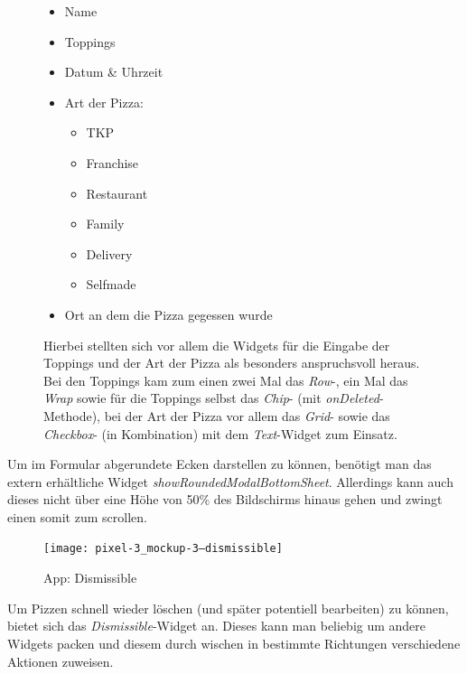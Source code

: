 \begin{figure}[H]
        \begin{itemize}
            \itemsep-0.4em
            \item Name
            \item Toppings
            \item Datum \& Uhrzeit
            \item Art der Pizza:
            \begin{itemize}
                \itemsep-0.4em
                \item \ac{TKP}
                \item Franchise
                \item Restaurant
                \item Family
                \item Delivery
                \item Selfmade
            \end{itemize}
            \item Ort an dem die Pizza gegessen wurde
        \end{itemize}

        Hierbei stellten sich vor allem die Widgets für die
        Eingabe der Toppings und der Art der Pizza als besonders
        anspruchsvoll heraus. Bei den Toppings kam zum einen
        zwei Mal das \textit{Row}-, ein Mal das \textit{Wrap}
        sowie für die Toppings selbst das \textit{Chip}-
        (mit \textit{onDeleted}-Methode), bei der
        Art der Pizza vor allem das \textit{Grid}- sowie
        das \textit{Checkbox}- (in Kombination) mit dem \textit{Text}-Widget
        zum Einsatz.
    \endminipage\hfill
\end{figure}
Um im Formular abgerundete Ecken darstellen zu können, benötigt man
das extern erhältliche Widget \textit{showRoundedModalBottomSheet}.
Allerdings kann auch dieses nicht über eine Höhe von 50\% des Bildschirms
hinaus gehen und zwingt einen somit zum scrollen.

\begin{figure}[H]
    \centering
    \texttt{[image: pixel-3\_mockup-3--dismissible]}
    \caption{App: Dismissible}
\end{figure}

Um Pizzen schnell wieder löschen (und später potentiell bearbeiten)
zu können, bietet sich das \textit{Dismissible}-Widget an.
Dieses kann man beliebig um andere Widgets packen und diesem
durch wischen in bestimmte Richtungen verschiedene Aktionen zuweisen.
\newpage
